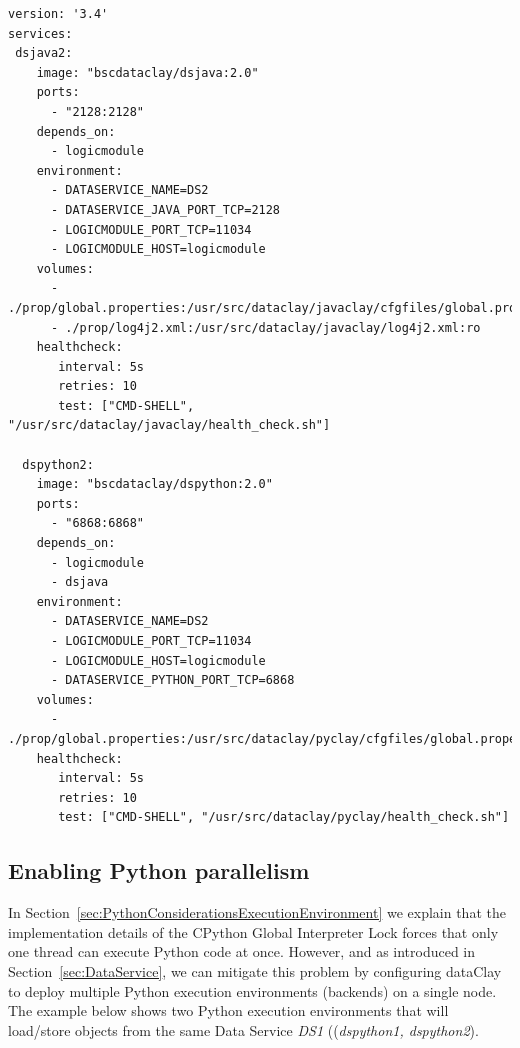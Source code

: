 \begin{tBox}
 \begin{lstlisting}[language=docker-compose-2, frame=none]
version: '3.4'
services:
 dsjava2:
    image: "bscdataclay/dsjava:2.0"
    ports:
      - "2128:2128"
    depends_on:
      - logicmodule
    environment:
      - DATASERVICE_NAME=DS2
      - DATASERVICE_JAVA_PORT_TCP=2128
      - LOGICMODULE_PORT_TCP=11034
      - LOGICMODULE_HOST=logicmodule
    volumes:
      - ./prop/global.properties:/usr/src/dataclay/javaclay/cfgfiles/global.properties:ro
      - ./prop/log4j2.xml:/usr/src/dataclay/javaclay/log4j2.xml:ro
    healthcheck:
       interval: 5s
       retries: 10
       test: ["CMD-SHELL", "/usr/src/dataclay/javaclay/health_check.sh"]
       
  dspython2:
    image: "bscdataclay/dspython:2.0"
    ports:
      - "6868:6868"
    depends_on:
      - logicmodule
      - dsjava
    environment:
      - DATASERVICE_NAME=DS2
      - LOGICMODULE_PORT_TCP=11034
      - LOGICMODULE_HOST=logicmodule
      - DATASERVICE_PYTHON_PORT_TCP=6868
    volumes:
      - ./prop/global.properties:/usr/src/dataclay/pyclay/cfgfiles/global.properties:ro
    healthcheck:
       interval: 5s
       retries: 10
       test: ["CMD-SHELL", "/usr/src/dataclay/pyclay/health_check.sh"]
 \end{lstlisting}
\end{tBox}


\subsection{Enabling Python parallelism}
\label{sec:PythonParallelism}

In Section~\ref{sec:PythonConsiderationsExecutionEnvironment} we explain that the implementation details of the CPython Global Interpreter Lock forces that only one thread can execute Python code at once. However, and as introduced in Section~\ref{sec:DataService}, we can mitigate this problem by configuring dataClay to deploy multiple Python execution environments (backends) on a single node. The example below shows two Python execution environments that will load/store objects from the same Data Service \textit{DS1} ((\textit{dspython1, dspython2}).

